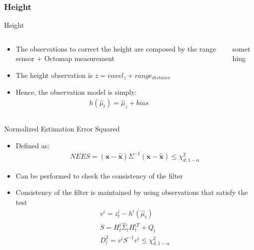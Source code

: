 \documentclass[serif,aspectratio=169]{beamer}
\begin{document}
    \subsubsection{Height}
    \begin{frame}{Height}
        \begin{columns}[c]
            \begin{column}{.6\textwidth}
                \begin{itemize}
                    \item{The observations to correct the height are composed by the range sensor + Octomap measurement}
                    \item{The height observation is $z = voxel_z + range_{distance}$}
                    \item{Hence, the observation model is simply: \begin{align*}
                            h\left(\hat\mu_t\right) = \hat\mu_z + bias
                    \end{align*}}
                \end{itemize}
            \end{column}
            \begin{column}{.4\textwidth}
               something
            \end{column}
        \end{columns}
    \end{frame}

    \begin{frame}{Normalized Estimation Error Squared}
        \begin{itemize}
            \item{Defined as:
                \begin{align*}
                    NEES = \left(\bm{x} - \hat{\bm{x}}\right) \Sigma^{-1} \left(\bm{x} - \hat{\bm{x}}\right) \le \chi_{d, 1-\alpha}^2
            \end{align*}}
            \item{Can be performed to check the consistency of the filter}
            \item{Consistency of the filter is maintained by using observations that
                satisfy the test
                \begin{align*}
                    v^i =  z_t^i - h^i \left( \hat\mu_t \right)\\
                    S = H_t^i \hat\Sigma_t H_t^{iT} + Q_t \\
                    D_i^2 = v^i S^{-1} v^i \le \chi_{d, 1-\alpha}^2
                    \label{eq:chapter2:nees:innov_test}
                \end{align*}
            }
        \end{itemize}
    \end{frame}
\end{document}
